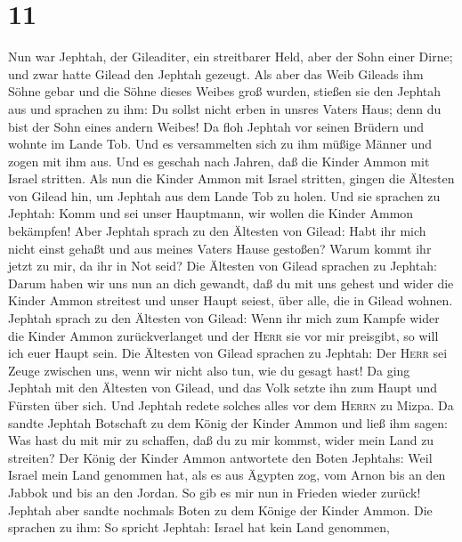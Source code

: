 \hypertarget{section-10}{%
\section{11}\label{section-10}}

 Nun war Jephtah, der Gileaditer, ein streitbarer Held,
aber der Sohn einer Dirne; und zwar hatte Gilead den Jephtah gezeugt.
 Als aber das Weib Gileads ihm Söhne gebar und die Söhne
dieses Weibes groß wurden, stießen sie den Jephtah aus und sprachen zu
ihm: Du sollst nicht erben in unsres Vaters Haus; denn du bist der Sohn
eines andern Weibes!  Da floh Jephtah vor seinen Brüdern
und wohnte im Lande Tob. Und es versammelten sich zu ihm müßige Männer
und zogen mit ihm aus.  Und es geschah nach Jahren, daß
die Kinder Ammon mit Israel stritten.  Als nun die Kinder
Ammon mit Israel stritten, gingen die Ältesten von Gilead hin, um
Jephtah aus dem Lande Tob zu holen.  Und sie sprachen zu
Jephtah: Komm und sei unser Hauptmann, wir wollen die Kinder Ammon
bekämpfen!  Aber Jephtah sprach zu den Ältesten von
Gilead: Habt ihr mich nicht einst gehaßt und aus meines Vaters Hause
gestoßen? Warum kommt ihr jetzt zu mir, da ihr in Not seid?
 Die Ältesten von Gilead sprachen zu Jephtah: Darum haben
wir uns nun an dich gewandt, daß du mit uns gehest und wider die Kinder
Ammon streitest und unser Haupt seiest, über alle, die in Gilead wohnen.
 Jephtah sprach zu den Ältesten von Gilead: Wenn ihr mich
zum Kampfe wider die Kinder Ammon zurückverlanget und der \textsc{Herr}
sie vor mir preisgibt, so will ich euer Haupt sein.  Die
Ältesten von Gilead sprachen zu Jephtah: Der \textsc{Herr} sei Zeuge
zwischen uns, wenn wir nicht also tun, wie du gesagt hast!
 Da ging Jephtah mit den Ältesten von Gilead, und das
Volk setzte ihn zum Haupt und Fürsten über sich. Und Jephtah redete
solches alles vor dem \textsc{Herrn} zu Mizpa.  Da sandte
Jephtah Botschaft zu dem König der Kinder Ammon und ließ ihm sagen: Was
hast du mit mir zu schaffen, daß du zu mir kommst, wider mein Land zu
streiten?  Der König der Kinder Ammon antwortete den
Boten Jephtahs: Weil Israel mein Land genommen hat, als es aus Ägypten
zog, vom Arnon bis an den Jabbok und bis an den Jordan. So gib es mir
nun in Frieden wieder zurück!  Jephtah aber sandte
nochmals Boten zu dem Könige der Kinder Ammon.  Die
sprachen zu ihm: So spricht Jephtah: Israel hat kein Land genommen,

